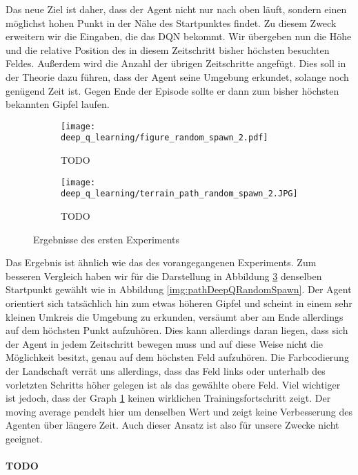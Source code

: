 Das neue Ziel ist daher, dass der Agent nicht nur nach oben läuft, sondern einen möglichst hohen Punkt in der Nähe des Startpunktes findet. Zu diesem Zweck erweitern wir die Eingaben, die das DQN bekommt. Wir übergeben nun die Höhe und die relative Position des in diesem Zeitschritt bisher höchsten besuchten Feldes. Außerdem wird die Anzahl der übrigen Zeitschritte angefügt. Dies soll in der Theorie dazu führen, dass der Agent seine Umgebung erkundet, solange noch genügend Zeit ist. Gegen Ende der Episode sollte er dann zum bisher höchsten bekannten Gipfel laufen.
\begin{figure}[H]
    \centering
    \begin{subfigure}[b]{0.49\textwidth}
        \texttt{[image: deep\_q\_learning/figure\_random\_spawn\_2.pdf]}
        \caption{TODO}
        \label{img:graphDeepQRandomSpawn2}
    \end{subfigure}
    \begin{subfigure}[b]{0.49\textwidth}
        \texttt{[image: deep\_q\_learning/terrain\_path\_random\_spawn\_2.JPG]}
        \caption{TODO}
        \label{img:pathDeepQRandomSpawn2}
    \end{subfigure}
    \caption{Ergebnisse des ersten Experiments}
\end{figure}
Das Ergebnis ist ähnlich wie das des vorangegangenen Experiments. Zum besseren Vergleich haben wir für die Darstellung in Abbildung \ref{img:pathDeepQRandomSpawn2} denselben Startpunkt gewählt wie in Abbildung \ref{img:pathDeepQRandomSpawn}. Der Agent orientiert sich tatsächlich hin zum etwas höheren Gipfel und scheint in einem sehr kleinen Umkreis die Umgebung zu erkunden, versäumt aber am Ende allerdings auf dem höchsten Punkt aufzuhören. Dies kann allerdings daran liegen, dass sich der Agent in jedem Zeitschritt bewegen muss und auf diese Weise nicht die Möglichkeit besitzt, genau auf dem höchsten Feld aufzuhören. Die Farbcodierung der Landschaft verrät uns allerdings, dass das Feld links oder unterhalb des vorletzten Schritts höher gelegen ist als das gewählte obere Feld. Viel wichtiger ist jedoch, dass der Graph \ref{img:graphDeepQRandomSpawn2} keinen wirklichen Trainingsfortschritt zeigt. Der moving average pendelt hier um denselben Wert und zeigt keine Verbesserung des Agenten über längere Zeit. Auch dieser Ansatz ist also für unsere Zwecke nicht geeignet.

\paragraph{TODO}

